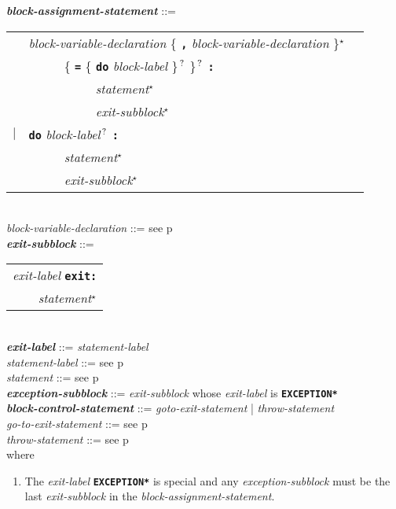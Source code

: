 \documentclass[12pt]{article}
\newcommand{\TT}[1]{{\tt \bfseries #1}}
\newcommand{\STAR}{{\Large $^\star$}}
\newcommand{\QMARK}{{$^{\,\mbox{\footnotesize ?}}$}}
\newcommand{\ttkey}[1]{{\tt \bfseries #1}}
\newcommand{\emkey}[1]{{\em \bfseries #1}}
\newcommand{\pagref}[1]{p\pageref{#1}}
\newenvironment{indpar}[1][0.3in]%
	{\begin{list}{}%
		     {\setlength{\itemsep}{0in}%
		      \setlength{\topsep}{0in}%
		      \setlength{\parsep}{1ex}%
		      \setlength{\labelwidth}{#1}%
		      \setlength{\leftmargin}{#1}%
		      \addtolength{\leftmargin}{\labelsep}}%
	 \item}%
	{\end{list}}
\begin{document}
\begin{indpar}
\emkey{block-assignment-statement} ::= \\
\hspace*{0.5in}\begin{tabular}[t]{@{}rll}
        & {\em block-variable-declaration}
                \{ \TT{,} {\em block-variable-declaration} \}\STAR{} \\
	& ~~~~~ \{ \TT{=} \{ \ttkey{do} {\em block-label} \}\QMARK{} \}\QMARK{}
		   \TT{:} \\
        & ~~~~~~~~~~ {\em statement}\STAR{} \\
        & ~~~~~~~~~~ {\em exit-subblock}\STAR{} \\
    $|$ & \ttkey{do} {\em block-label}\QMARK{} \TT{:} \\
        & ~~~~~ {\em statement}\STAR{} \\
        & ~~~~~ {\em exit-subblock}\STAR{} \\
    \end{tabular}
\\[0.5ex]
{\em block-variable-declaration} ::=
    see \pagref{BLOCK-VARIABLE-DECLARATION}
\\[0.5ex]
\emkey{exit-subblock}\label{EXIT-SUBBLOCK} ::=
    \begin{tabular}[t]{l}
    {\em exit-label} \ttkey{exit}\TT{:} \\
    \TT{~~~~}{\em statement}\STAR{} \\
    \end{tabular} \\
\emkey{exit-label} ::= {\em statement-label}
\\[0.5ex]
{\em statement-label} ::= see \pagref{STATEMENT-LABEL} \\
{\em statement} ::= see \pagref{STATEMENT}
\\[0.5ex]
\emkey{exception-subblock}\label{EXCEPTION-SUBBLOCK} ::=
    {\em exit-subblock} whose {\em exit-label} is \ttkey{*EXCEPTION*}
\\[0.5ex]
\emkey{block-control-statement}\label{BLOCK-CONTROL-STATEMENT}
	::= {\em goto-exit-statement} | {\em throw-statement} \\
{\em go-to-exit-statement} ::= see \pagref{GO-TO-STATEMENT} \\
{\em throw-statement} ::= see \pagref{THROW-STATEMENT}
\\[2.0ex]
where
\begin{enumerate}

\item The {\em exit-label} \ttkey{*EXCEPTION*} is special and
any {\em exception-subblock} must be the last {\em exit-subblock}
in the {\em block-assignment-statement}.

\end{enumerate}
\end{indpar}
\end{document}
